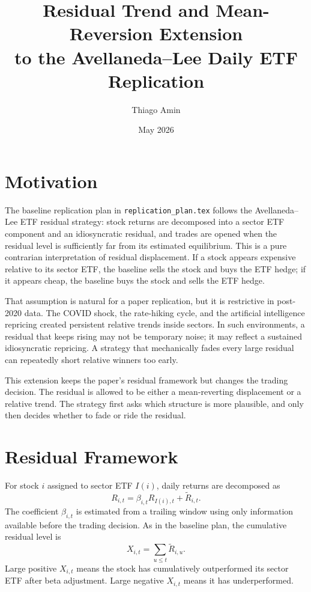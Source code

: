 \documentclass[11pt]{article}
\title{Residual Trend and Mean-Reversion Extension\\
to the Avellaneda--Lee Daily ETF Replication}
\author{Thiago Amin}
\date{May 2026}
\begin{document}
\maketitle

\section{Motivation}

The baseline replication plan in \texttt{replication\_plan.tex} follows the
Avellaneda--Lee ETF residual strategy: stock returns are decomposed into a
sector ETF component and an idiosyncratic residual, and trades are opened when
the residual level is sufficiently far from its estimated equilibrium. This is
a pure contrarian interpretation of residual displacement. If a stock appears
expensive relative to its sector ETF, the baseline sells the stock and buys the
ETF hedge; if it appears cheap, the baseline buys the stock and sells the ETF
hedge.

That assumption is natural for a paper replication, but it is restrictive in
post-2020 data. The COVID shock, the rate-hiking cycle, and the artificial
intelligence repricing created persistent relative trends inside sectors. In
such environments, a residual that keeps rising may not be temporary noise; it
may reflect a sustained idiosyncratic repricing. A strategy that mechanically
fades every large residual can repeatedly short relative winners too early.

This extension keeps the paper's residual framework but changes the trading
decision. The residual is allowed to be either a mean-reverting displacement
or a relative trend. The strategy first asks which structure is more plausible,
and only then decides whether to fade or ride the residual.

\section{Residual Framework}

For stock $i$ assigned to sector ETF $I(i)$, daily returns are decomposed as
\[
    R_{i,t}
    =
    \beta_{i,t} R_{I(i),t}
    +
    \widetilde{R}_{i,t}.
\]
The coefficient $\beta_{i,t}$ is estimated from a trailing window using only
information available before the trading decision. As in the baseline plan,
the cumulative residual level is
\[
    X_{i,t}
    =
    \sum_{u \le t} \widetilde{R}_{i,u}.
\]
Large positive $X_{i,t}$ means the stock has cumulatively outperformed its
sector ETF after beta adjustment. Large negative $X_{i,t}$ means it has
underperformed.
\end{document}
